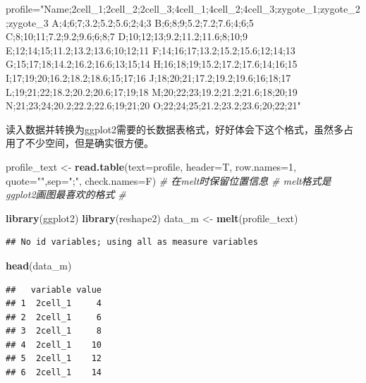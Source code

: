 \documentclass[]{article}
\newenvironment{Shaded}{\begin{snugshade}}{\end{snugshade}}
\newcommand{\KeywordTok}[1]{\textcolor[rgb]{0.13,0.29,0.53}{\textbf{{#1}}}}
\newcommand{\DataTypeTok}[1]{\textcolor[rgb]{0.13,0.29,0.53}{{#1}}}
\newcommand{\DecValTok}[1]{\textcolor[rgb]{0.00,0.00,0.81}{{#1}}}
\newcommand{\StringTok}[1]{\textcolor[rgb]{0.31,0.60,0.02}{{#1}}}
\newcommand{\CommentTok}[1]{\textcolor[rgb]{0.56,0.35,0.01}{\textit{{#1}}}}
\newcommand{\NormalTok}[1]{{#1}}
\numberwithin{figure}{section}
\numberwithin{table}{section}
\theoremstyle{definition}
\theoremstyle{definition}
\theoremstyle{definition}
\theoremstyle{remark}
\begin{document}
\begin{Shaded}
\begin{Highlighting}[]
\NormalTok{profile=}\StringTok{"Name;2cell_1;2cell_2;2cell_3;4cell_1;4cell_2;4cell_3;zygote_1;zygote_2;zygote_3}
\StringTok{A;4;6;7;3.2;5.2;5.6;2;4;3}
\StringTok{B;6;8;9;5.2;7.2;7.6;4;6;5}
\StringTok{C;8;10;11;7.2;9.2;9.6;6;8;7}
\StringTok{D;10;12;13;9.2;11.2;11.6;8;10;9}
\StringTok{E;12;14;15;11.2;13.2;13.6;10;12;11}
\StringTok{F;14;16;17;13.2;15.2;15.6;12;14;13}
\StringTok{G;15;17;18;14.2;16.2;16.6;13;15;14}
\StringTok{H;16;18;19;15.2;17.2;17.6;14;16;15}
\StringTok{I;17;19;20;16.2;18.2;18.6;15;17;16}
\StringTok{J;18;20;21;17.2;19.2;19.6;16;18;17}
\StringTok{L;19;21;22;18.2;20.2;20.6;17;19;18}
\StringTok{M;20;22;23;19.2;21.2;21.6;18;20;19}
\StringTok{N;21;23;24;20.2;22.2;22.6;19;21;20}
\StringTok{O;22;24;25;21.2;23.2;23.6;20;22;21"}
\end{Highlighting}
\end{Shaded}

读入数据并转换为ggplot2需要的长数据表格式，好好体会下这个格式，虽然多占用了不少空间，但是确实很方便。

\begin{Shaded}
\begin{Highlighting}[]
\NormalTok{profile_text <-}\StringTok{ }\KeywordTok{read.table}\NormalTok{(}\DataTypeTok{text=}\NormalTok{profile, }\DataTypeTok{header=}\NormalTok{T, }\DataTypeTok{row.names=}\DecValTok{1}\NormalTok{, }\DataTypeTok{quote=}\StringTok{""}\NormalTok{,}\DataTypeTok{sep=}\StringTok{";"}\NormalTok{, }\DataTypeTok{check.names=}\NormalTok{F)}
\CommentTok{# 在melt时保留位置信息}
\CommentTok{# melt格式是ggplot2画图最喜欢的格式}
\CommentTok{# }

\KeywordTok{library}\NormalTok{(ggplot2)}
\KeywordTok{library}\NormalTok{(reshape2)}
\NormalTok{data_m <-}\StringTok{ }\KeywordTok{melt}\NormalTok{(profile_text)}
\end{Highlighting}
\end{Shaded}

\begin{verbatim}
## No id variables; using all as measure variables
\end{verbatim}

\begin{Shaded}
\begin{Highlighting}[]
\KeywordTok{head}\NormalTok{(data_m)}
\end{Highlighting}
\end{Shaded}

\begin{verbatim}
##   variable value
## 1  2cell_1     4
## 2  2cell_1     6
## 3  2cell_1     8
## 4  2cell_1    10
## 5  2cell_1    12
## 6  2cell_1    14
\end{verbatim}
\end{document}
